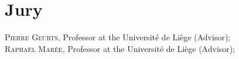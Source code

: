 \chapter*{Jury}

\noindent \textsc{Pierre Geurts}, Professor at the Universit{\'e} de Li{\`e}ge (Advisor); \\[2ex]
\noindent \textsc{Raphaël Marée}, Professor at the Universit{\'e} de Li{\`e}ge (Advisor); \\[2ex]
